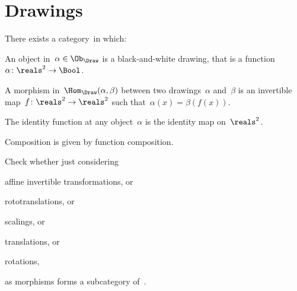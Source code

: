 \section{Drawings}

\begin{definition}[Drawings]
  \label{def:Draw}
  There exists a category~\Draw in which:
  \begin{compactenum}
    \item An object in~$\alpha\in \Ob_\Draw$ is a black-and-white drawing,
    that is a function~$\alpha \colon \reals^2 \to \Bool$.
    \item A morphism in~$\Hom_{\Draw}(\alpha, \beta)$ between two drawings~$\alpha$ and~$\beta$ is an invertible map~$f\colon \reals^2 \to \reals^2$ such that~$\alpha(x) = \beta(f(x))$.
    \item The identity function at any object~$\alpha$ is the identity map
    on~$\reals^2$.
    \item Composition is given by function composition.
  \end{compactenum}
\end{definition}

\begin{exercise}
  Check whether just considering
  \begin{compactitem}
    \item affine invertible transformations, or
    \item rototranslations, or
    \item scalings, or
    \item translations, or
    \item rotations,
  \end{compactitem}
  as morphisms forms a subcategory of~\Draw.
\end{exercise}

